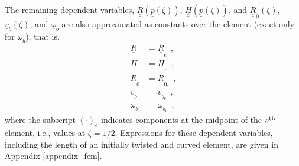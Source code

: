 \documentclass[12pt,a4paper,oneside,english]{abntex2} %
\newcommand{\fix}[1]{{\color{red}#1}}
\newcommand{\vect}[1]{\underline{#1}}
\def\tens#1{\underline{\underline{#1}}}
\def\lp{\left(}
\def\rp{\right)}
\def\R{\tens{R}}
\def\Rz{\R_0}
\def\vb{\vect{v}_b}
\def\om{\vect{\omega}_b}
\def\H{\tens{H}}
\def\p{\vect{p}}
\def\vbe{\vect{v}_{b_e}}
\def\ombe{\vect{\omega}_{b_e}}
\def\He{\H_e}
\def\Re{\R_{e}}
\def\Rze{\R_{0_e}}
\begin{document}
The remaining dependent variables, $\R\lp\p\lp\zeta\rp\rp$, $\H\lp\p\lp\zeta\rp\rp$, and $\Rz\lp\zeta\rp$, $\vb\lp\zeta\rp$, and $\om$ are \fix{also approximated as constants over the element (exact only for $\om$)}, that is,
\begin{equation}
    \begin{aligned}
        \R &= \Re \ \ , \\
        \H &= \He \ \ , \\
        \Rz &= \Rze \ \ , \\
        \vb &= \vbe \ \ , \\
        \om &= \ombe \ \ ,
        \label{eq:vars_e2}
    \end{aligned}
\end{equation}
where the subscript $\lp\cdot\rp_{e}$ indicates components at the midpoint of the $e^{\textnormal{th}}$ element, i.e., values at $\zeta = 1/2$. Expressions for these dependent variables, including the length of an initially twisted and curved element, are given in Appendix \ref{appendix_fem}. 
\end{document}
